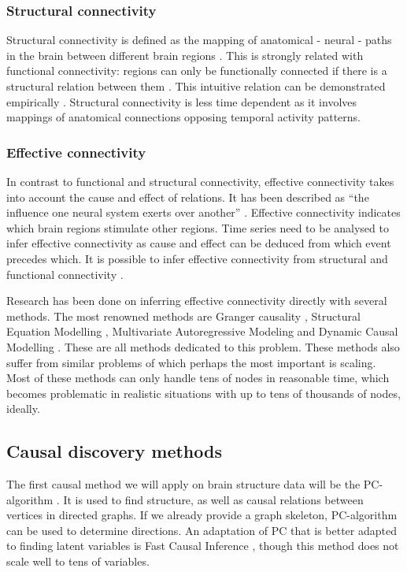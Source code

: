 \documentclass[a4paper, 10pt, english, twocolumn]{article}
\begin{document}
\subsubsection*{Structural connectivity}
Structural connectivity is defined as the mapping of anatomical - neural - paths in the brain between different brain regions \cite{friston1994}.
This is strongly related with functional connectivity: regions can only be functionally connected if there is a structural relation between them \cite{cabral2012}.
This intuitive relation can be demonstrated empirically \cite{vandenheuvel2009}.
Structural connectivity is less time dependent as it involves mappings of anatomical connections opposing temporal activity patterns.

\subsubsection*{Effective connectivity}
In contrast to functional and structural connectivity, effective connectivity takes into account the cause and effect of relations.
It has been described as ``the influence one neural system exerts over another'' \cite{friston1994}.
Effective connectivity indicates which brain regions stimulate other regions.
Time series need to be analysed to infer effective connectivity as cause and effect can be deduced from which event precedes which. 
It is possible to infer effective connectivity from structural and functional connectivity \cite{mclntosh1994, harrison2003, friston2003, roebroeck2005}.

Research has been done on inferring effective connectivity directly with several methods.
The most renowned methods are Granger causality \cite{roebroeck2005}, Structural Equation Modelling \cite{mclntosh1994}, Multivariate Autoregressive Modeling \cite{harrison2003} and Dynamic Causal Modelling \cite{friston2003}.
These are all methods dedicated to this problem.
These methods also suffer from similar problems of which perhaps the most important is scaling.
Most of these methods can only handle tens of nodes in reasonable time, which becomes problematic in realistic situations with up to tens of thousands of nodes, ideally.

\subsection*{Causal discovery methods}
The first causal method we will apply on brain structure data will be the PC-algorithm \cite{spirtes2000}.
It is used to find structure, as well as causal relations between vertices in directed graphs. 
If we already provide a graph skeleton, PC-algorithm can be used to determine directions.
An adaptation of PC that is better adapted to finding latent variables is Fast Causal Inference \cite{spirtes2000}, though this method does not scale well to tens of variables.
\end{document}
